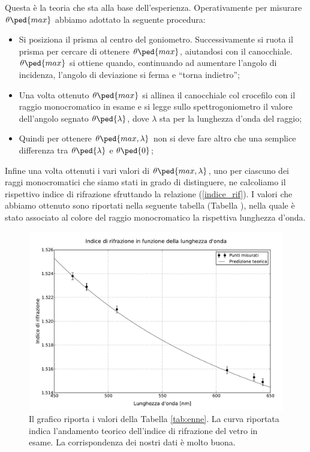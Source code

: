 Questa è la teoria che sta alla base dell'esperienza. Operativamente per misurare $\theta\ped{max}$ abbiamo adottato la seguente procedura:

\begin{itemize}
	\item{Si posiziona il prisma al centro del goniometro. Successivamente si ruota il prisma per cercare di ottenere $\theta\ped{max}$, aiutandosi con il canocchiale. $\theta\ped{max}$ si ottiene quando, continuando ad aumentare l'angolo di incidenza, l'angolo di deviazione si ferma e ``torna indietro'';}
	\item{Una volta ottenuto $\theta\ped{max}$ si allinea il canocchiale col crocefilo con il raggio monocromatico in esame e si legge sullo spettrogoniometro il valore dell'angolo segnato $\theta\ped{\lambda}$, dove $\lambda$ sta per la lunghezza d'onda del raggio;}
	\item{Quindi per ottenere $\theta\ped{max,\lambda}$ non si deve fare altro che una semplice differenza tra $\theta\ped{\lambda}$ e $\theta\ped{0}$;}
\end{itemize}

Infine una volta ottenuti i vari valori di $\theta\ped{max,\lambda}$, uno per ciascuno dei raggi monocromatici che siamo stati in grado di distinguere, ne calcoliamo il rispettivo indice di rifrazione sfruttando la relazione (\ref{indice_rif}). I valori che abbiamo ottenuto sono riportati nella seguente tabella (Tabella \label{tab:enne}), nella quale è stato associato al colore del raggio monocromatico la rispettiva lunghezza d'onda.



\begin{figure}[b!]
    \includegraphics[width=16cm]{wave_index.pdf}
    \caption{Il grafico riporta i valori della Tabella \ref{tab:enne}. La curva riportata indica l'andamento teorico dell'indice di rifrazione del vetro in esame. La corrispondenza dei nostri dati è molto buona.}
    \label{fig:wave}
\end{figure}


